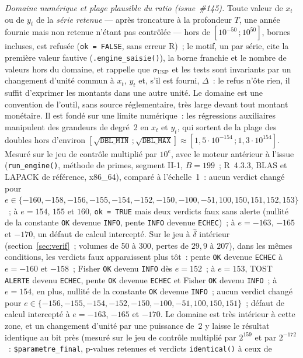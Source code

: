 \documentclass[a4paper,11pt]{article}
\newcommand{\code}[1]{\texttt{\small #1}}
\begin{document}
\emph{Domaine numérique et plage plausible du ratio (issue~\#145).} Toute valeur de $x_t$ ou
de $y_t$ de la \emph{série retenue} --- après troncature à la profondeur $T$, une année fournie
mais non retenue n'étant pas contrôlée --- hors de $[10^{-50}\,;10^{50}]$, bornes incluses, est
refusée (\code{ok = FALSE}, sans erreur R)~; le motif, un par série, cite la première valeur
fautive (\code{.engine\_saisie()}), la borne franchie et le nombre de valeurs hors du domaine,
et rappelle que $\sigma_{\mathrm{USP}}$ et les tests sont invariants par un changement d'unité
commun à $x_t$, $y_t$ et, s'il est fourni, $\Delta$~: le refus n'ôte rien, il suffit
d'exprimer les montants dans une autre unité. Le domaine est une convention de l'outil, sans
source réglementaire, très large devant tout montant monétaire. Il est fondé sur une limite
numérique~: les régressions auxiliaires manipulent des grandeurs de degré~2 en $x_t$ et $y_t$,
qui sortent de la plage des doubles hors d'environ $[\sqrt{\mathtt{DBL\_MIN}}\,;
\sqrt{\mathtt{DBL\_MAX}}] \approx [1{,}5 \cdot 10^{-154}\,; 1{,}3 \cdot 10^{154}]$. Mesuré sur le
jeu de contrôle multiplié par $10^{e}$, avec le moteur antérieur à l'issue (\code{run\_engine()},
méthode de primes, segment II-1, $B = 199$~; R~4.3.3, BLAS et LAPACK de référence, x86\_64),
comparé à l'échelle~1~: aucun verdict changé pour
$e \in \{-160, -158, -156, -155, -154, -152, -150, -100, -51, 100, 150, 151, 152, 153\}$~; à $e = 154$, $155$ et $160$, \code{ok = TRUE} mais deux verdicts faux sans
alerte (nullité de la constante \code{OK} devenue \code{INFO}, pente \code{INFO} devenue
\code{ECHEC})~; à $e = -163$, $-165$ et $-170$, un défaut de calcul intercepté. Sur le jeu à
$\hat\delta$ intérieur (section~\ref{sec:verif}~; volumes de 50 à 300, pertes de $29{,}9$ à
$207$), dans les mêmes conditions, les verdicts faux apparaissent plus tôt~: pente \code{OK}
devenue \code{ECHEC} à $e = -160$ et $-158$~; Fisher \code{OK} devenu \code{INFO} dès
$e = 152$~; à $e = 153$, TOST \code{ALERTE} devenu \code{ECHEC}, pente \code{OK} devenue
\code{ECHEC} et Fisher \code{OK} devenu \code{INFO}~; à $e = 154$, en plus, nullité de la
constante \code{OK} devenue \code{INFO}~; aucun verdict changé pour
$e \in \{-156, -155, -154, -152, -150, -100, -51, 100, 150, 151\}$~; défaut de calcul intercepté
à $e = -163$, $-165$ et $-170$. Le domaine est très
intérieur à cette zone, et un changement d'unité par une puissance de~2 y laisse le résultat
identique au bit près (mesuré sur le jeu de contrôle multiplié par $2^{159}$ et par $2^{-172}$~:
\code{\$parametre\_final}, p-values retenues et verdicts \code{identical()} à ceux de
\end{document}
